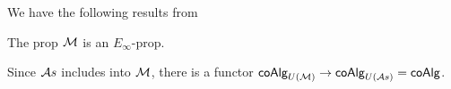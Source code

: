 We have the following results from \cite{Medina20prop1}

\begin{proposition}
	The prop $\mathcal{M}$ is an $E_\infty$-prop.
\end{proposition}

Since $\mathcal{A}s$ includes into $\mathcal{M}$, there is a functor $\mathsf{coAlg}_{U(\mathcal{M})} \to \mathsf{coAlg}_{U(\mathcal{A}s)} = \mathsf{coAlg}$.
